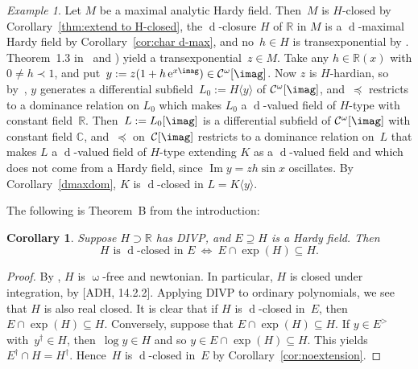 \documentclass[]{amsart}
\numberwithin{equation}{section}
\newcommand{\bbold}{\mathbb}
\def\R { {\bbold R} }
\def\C { {\bbold C} }
\def\c {\mathcal{C}}
\def \ex{\operatorname{e}}
\def \d{\operatorname{d}}
\renewcommand{\Im}{\operatorname{Im}}
\newtheorem{cor}[theorem]{Corollary}
\theoremstyle{definition}
\theoremstyle{remark}
\newtheorem*{example}{Example}
\renewcommand\preceq{\preccurlyeq}
\def \upo{\upomega}
\def \Gom{\mathcal{C}^{\omega}}
\begin{document}
\begin{example} 
Let $M$ be a maximal analytic Hardy field. Then~$M$ is $H$-closed by Corollary~\ref{thm:extend to H-closed},
the $\d$-closure $H$  of $\R$ in $M$ is a $\d$-maximal  Hardy field by Corollary~\ref{cor:char d-max}, and no~$h\in H$ is transexponential
 by \cite[Lem\-ma~5.1]{ADH5}.
Theo\-rem~1.3 in~\cite{Boshernitzan86} and \cite[Corollary~5.24]{ADH5}) yield 
a transexponential~$z\in M$. Take any $h\in\R(x)$ with $0\ne h\prec 1$, and put~$y:=z(1+h\ex^{x\imag})\in\Gom[\imag]$.
Now $z$ is $H$-hardian, 
so by~\cite[Lemma~5.16]{ADH5}, $y$ generates a differential subfield~$L_0:=H\langle y\rangle$
of $\Gom[\imag]$, and~$\preceq$ restricts to a dominance relation on $L_0$ which makes $L_0$ a $\d$-valued field
of $H$-type with constant field~$\R$. Then~$L:=L_0[\imag]$ is a differential subfield of $\Gom[\imag]$ with
constant field $\C$, and~$\preceq$ on~$\c[\imag]$ restricts to a dominance relation on~$L$ that makes $L$ a $\d$-valued field
of $H$-type extending $K$ as a $\d$-valued field and which  does not come from a Hardy field, since $\Im y=zh\sin x$ oscillates. 
By Corollary~\ref{dmaxdom}, $K$ is $\d$-closed in $L=K\langle y\rangle$.
\end{example}

\noindent
The following is  Theorem~B from the introduction:

 
\begin{cor}\label{corhe}
Suppose $H\supset\R$ has \textup{DIVP}, and $E\supseteq H$ is a Hardy field. Then 
$$H \text{ is $\d$-closed in  $E$}\ \Longleftrightarrow\  E\cap \exp(H) \subseteq H.$$
\end{cor}
\begin{proof}
By \cite[Corollary~2.6]{ADHip}, $H$ is $\upo$-free and newtonian. In particular, $H$ is closed under integration, by [ADH, 14.2.2]. Applying \textup{DIVP} to ordinary polynomials, we see that $H$ is also real closed. 
It is clear that 
if  $H$ is $\d$-closed in~$E$, then~${E\cap \exp(H) \subseteq H}$. Conversely,
suppose that $E\cap\exp(H)\subseteq H$. If $y\in E^>$ with~${y^\dagger\in H}$, then~${\log y\in H}$ and so $y \in E\cap\exp(H)\subseteq H$. This yields~$E^\dagger\cap H=H^\dagger$. Hence~$H$ is $\d$-closed in~$E$ by Corollary~\ref{cor:noextension}. \end{proof}
\end{document}

